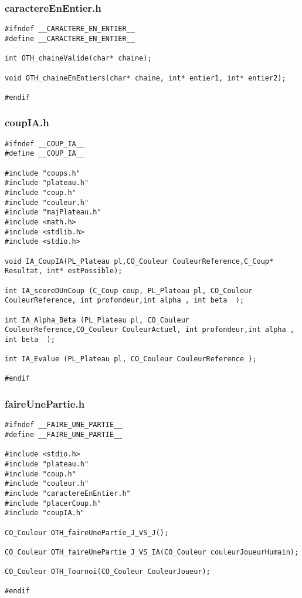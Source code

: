 \subsubsection{caractereEnEntier.h}
\begin{lstlisting}
#ifndef __CARACTERE_EN_ENTIER__
#define __CARACTERE_EN_ENTIER__

int OTH_chaineValide(char* chaine);

void OTH_chaineEnEntiers(char* chaine, int* entier1, int* entier2);

#endif

\end{lstlisting}
\subsubsection{coupIA.h}
\begin{lstlisting}
#ifndef __COUP_IA__
#define __COUP_IA__

#include "coups.h"
#include "plateau.h"
#include "coup.h"
#include "couleur.h"
#include "majPlateau.h"
#include <math.h>
#include <stdlib.h>
#include <stdio.h>

void IA_CoupIA(PL_Plateau pl,CO_Couleur CouleurReference,C_Coup* Resultat, int* estPossible);

int IA_scoreDUnCoup (C_Coup coup, PL_Plateau pl, CO_Couleur CouleurReference, int profondeur,int alpha , int beta  );

int IA_Alpha_Beta (PL_Plateau pl, CO_Couleur CouleurReference,CO_Couleur CouleurActuel, int profondeur,int alpha , int beta  );

int IA_Evalue (PL_Plateau pl, CO_Couleur CouleurReference );

#endif
\end{lstlisting}

\subsubsection{faireUnePartie.h}
\begin{lstlisting}
#ifndef __FAIRE_UNE_PARTIE__
#define __FAIRE_UNE_PARTIE__

#include <stdio.h>
#include "plateau.h"
#include "coup.h"
#include "couleur.h"
#include "caractereEnEntier.h"
#include "placerCoup.h"
#include "coupIA.h"

CO_Couleur OTH_faireUnePartie_J_VS_J();

CO_Couleur OTH_faireUnePartie_J_VS_IA(CO_Couleur couleurJoueurHumain);

CO_Couleur OTH_Tournoi(CO_Couleur CouleurJoueur);

#endif

\end{lstlisting}
